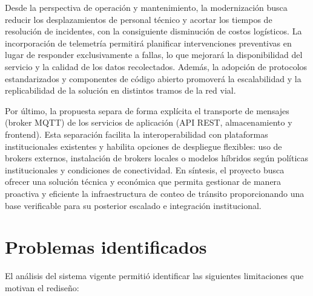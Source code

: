 Desde la perspectiva de operación y mantenimiento, la modernización busca reducir los desplazamientos de personal técnico y acortar los tiempos de resolución de incidentes, con la consiguiente disminución de costos logísticos. La incorporación de telemetría permitirá planificar intervenciones preventivas en lugar de responder exclusivamente a fallas, lo que mejorará la disponibilidad del servicio y la calidad de los datos recolectados. Además, la adopción de protocolos estandarizados y componentes de código abierto promoverá la escalabilidad y la replicabilidad de la solución en distintos tramos de la red vial.

Por último, la propuesta separa de forma explícita el transporte de mensajes (broker MQTT) de los servicios de aplicación (API REST, almacenamiento y frontend). Esta separación facilita la interoperabilidad con plataformas institucionales existentes y habilita opciones de despliegue flexibles: uso de brokers externos, instalación de brokers locales o modelos híbridos según políticas institucionales y condiciones de conectividad. En síntesis, el proyecto busca ofrecer una solución técnica y económica que permita gestionar de manera proactiva y eficiente la infraestructura de conteo de tránsito proporcionando una base verificable para su posterior escalado e integración institucional.


\newpage

\section{Problemas identificados}

El análisis del sistema vigente permitió identificar las siguientes limitaciones que motivan el rediseño:

